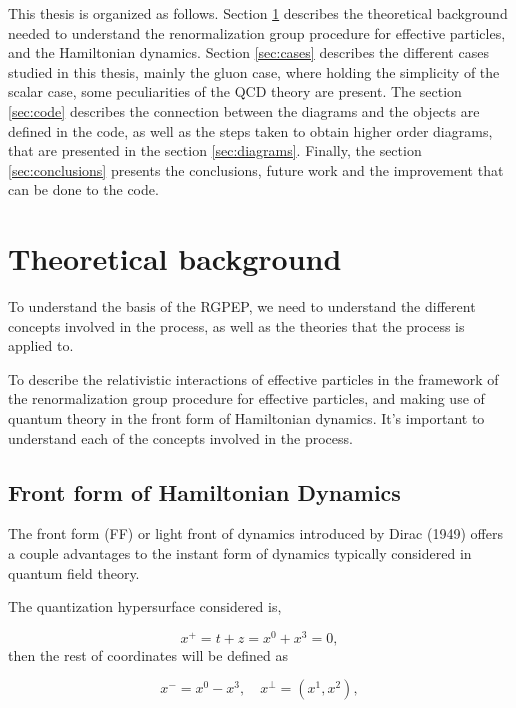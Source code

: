 \documentclass[11pt,a4paper,twoside,pdf]{article}
\numberwithin{equation}{section}
\begin{document}
This thesis is organized as follows. Section \ref{sec:theoretical_background} describes
the theoretical background needed to understand the renormalization group procedure
for effective particles, and the Hamiltonian dynamics. Section \ref{sec:cases}
describes the different cases studied in this thesis, mainly the gluon case, where
holding the simplicity of the scalar case, some peculiarities of the QCD theory are 
present. The section \ref{sec:code} describes the connection between the diagrams 
and the objects are defined in the code, as well as the steps taken to obtain higher 
order diagrams, that are presented in the section \ref{sec:diagrams}. Finally, the 
section \ref{sec:conclusions} presents the conclusions, future work and the 
improvement that can be done to the code.



\section{Theoretical background} \label{sec:theoretical_background}

To understand the basis of the RGPEP, we need to understand the different
concepts involved in the process, as well as the theories that the process is
applied to.  

To describe the relativistic interactions of effective particles in the framework of 
the renormalization group procedure for effective particles, and making use of 
quantum theory in the front form of Hamiltonian dynamics. It's important to 
understand each of the concepts involved in the process.

\subsection{Front form of Hamiltonian Dynamics}

The front form (FF) or light front of dynamics introduced by Dirac (1949) 
\cite{dirac_front_forms_1949} offers a couple advantages to the instant form of 
dynamics typically considered in quantum field theory. 

The quantization hypersurface considered is,

\begin{equation}
    x^+ = t+z = x^0 + x^3 = 0,
\end{equation}
then the rest of coordinates will be defined as

\begin{equation}
    x^- = x^0-x^3, \quad x^\perp = (x^1, x^2),
\end{equation}
\end{document}
